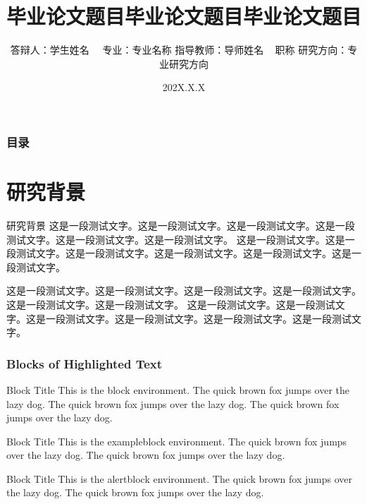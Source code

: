 \documentclass[noamsthm,notheorems,11pt,compress]{beamer}
\title[论文题目]{毕业论文题目毕业论文题目毕业论文题目}
\author[学生姓名]
{
    答辩人：学生姓名~~ \vskip 3mm
    专业：专业名称 \vskip 3mm
    指导教师：导师姓名 ~ 职称 \vskip 3mm
    研究方向：专业研究方向
}
\institute[学校名称]{}
\date[202X.X.X]{202X.X.X}
\numberwithin{figure}{section}
\numberwithin{table}{section}
\numberwithin{equation}{section}
\theoremstyle{plain} %
\begin{document}
\setlength{\baselineskip}{15pt}


{%
\begin{frame}
\titlepage %
\end{frame}}


\begin{frame}
\frametitle{目录}
\tableofcontents
\end{frame}



\section{研究背景}

\begin{frame}{研究背景}
这是一段测试文字。这是一段测试文字。这是一段测试文字。这是一段测试文字。这是一段测试文字。这是一段测试文字。
这是一段测试文字。这是一段测试文字。这是一段测试文字。这是一段测试文字。这是一段测试文字。这是一段测试文字。

\vspace{1ex}
这是一段测试文字。这是一段测试文字。这是一段测试文字。这是一段测试文字。这是一段测试文字。这是一段测试文字。
这是一段测试文字。这是一段测试文字。这是一段测试文字。这是一段测试文字。这是一段测试文字。这是一段测试文字。

\end{frame}


\begin{frame}
\frametitle{Blocks of Highlighted Text}
\begin{block}{Block Title}
This is the block environment. The quick brown fox jumps over the lazy dog. The quick brown fox jumps over the lazy dog. The quick brown fox jumps over the lazy dog.
\end{block}

\begin{exampleblock}{Block Title}
This is the exampleblock environment. The quick brown fox jumps over the lazy dog. The quick brown fox jumps over the lazy dog.
\end{exampleblock}

\begin{alertblock}{Block Title}
This is the alertblock environment. The quick brown fox jumps over the lazy dog. The quick brown fox jumps over the lazy dog.
\end{alertblock}
\end{frame}
\end{document}
